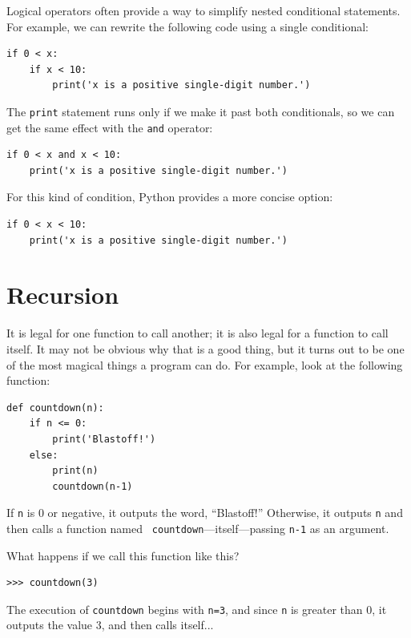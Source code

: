\documentclass[10pt]{book}
\begin{document}
Logical operators often provide a way to simplify nested conditional
statements.  For example, we can rewrite the following code using a
single conditional:

\begin{verbatim}
if 0 < x:
    if x < 10:
        print('x is a positive single-digit number.')
\end{verbatim}
%
The {\tt print} statement runs only if we make it past both
conditionals, so we can get the same effect with the {\tt and} operator:

\begin{verbatim}
if 0 < x and x < 10:
    print('x is a positive single-digit number.')
\end{verbatim}

For this kind of condition, Python provides a more concise option:

\begin{verbatim}
if 0 < x < 10:
    print('x is a positive single-digit number.')
\end{verbatim}


\section{Recursion}
\label{recursion}

It is legal for one function to call another;
it is also legal for a function to call itself.  It may not be obvious
why that is a good thing, but it turns out to be one of the most
magical things a program can do.
For example, look at the following function:

\begin{verbatim}
def countdown(n):
    if n <= 0:
        print('Blastoff!')
    else:
        print(n)
        countdown(n-1)
\end{verbatim}
%
If {\tt n} is 0 or negative, it outputs the word, ``Blastoff!''
Otherwise, it outputs {\tt n} and then calls a function named {\tt
countdown}---itself---passing {\tt n-1} as an argument.

What happens if we call this function like this?

\begin{verbatim}
>>> countdown(3)
\end{verbatim}
%
The execution of {\tt countdown} begins with {\tt n=3}, and since
{\tt n} is greater than 0, it outputs the value 3, and then calls itself...
\end{document}
